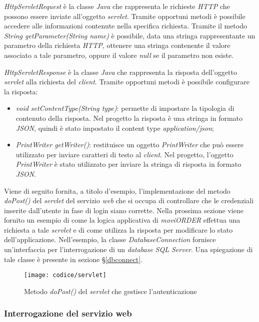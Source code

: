 \textit{HttpServletRequest} è la classe \textit{Java} che rappresenta le richieste \textit{HTTP} che possono essere inviate all'oggetto \textit{servlet}. Tramite opportuni metodi è possibile accedere alle informazioni contenute nella specifica richiesta. Tramite il metodo \textit{String getParameter(String name)} è possibile, data una stringa rappresentante un parametro della richiesta \textit{HTTP}, ottenere una stringa contenente il valore associato a tale parametro, oppure il valore \textit{null} se il parametro non esiste.

\textit{HttpServletResponse} è la classe \textit{Java} che rappresenta la risposta dell'oggetto \textit{servlet} alla richiesta del \textit{client}. Tramite opportuni metodi è possibile configurare la risposta:
\begin{itemize}
	\item \textit{void setContentType(String type)}: permette di impostare la tipologia di contenuto della risposta. Nel progetto la risposta è una stringa in formato \textit{JSON}, quindi è stato impostato il content type \textit{application/json};
	\item \textit{PrintWriter getWriter()}: restituisce un oggetto \textit{PrintWriter} che può essere utilizzato per inviare caratteri di testo al \textit{client}. Nel progetto, l'oggetto \textit{PrintWriter} è stato utilizzato per inviare la stringa di risposta in formato \textit{JSON}.
\end{itemize}

Viene di seguito fornita, a titolo d'esempio, l'implementazione del metodo \textit{doPost()} del \textit{servlet} del servizio \textit{web} che si occupa di controllare che le credenziali inserite dall'utente in fase di login siano corrette. Nella prossima sezione viene fornito un esempio di come la logica applicativa di \textit{moviORDER} effettua una richiesta a tale \textit{servlet} e di come utilizza la risposta per modificare lo stato dell'applicazione. Nell'esempio, la classe \textit{DatabaseConnection} fornisce un'interfaccia per l'interrogazione di un \textit{database} \textit{SQL Server}. Una spiegazione di tale classe è presente in sezione §\ref{dbconnect}.

\begin{figure}[!h] 
    \centering 
    \texttt{[image: codice/servlet]} 
    \caption{Metodo \textit{doPost()} del \textit{servlet} che gestisce l'autenticazione}
\end{figure}

\subsubsection{Interrogazione del servizio web}

